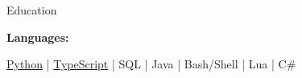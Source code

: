 \documentclass{resume/resume}
\begin{document}
\begin{rSection}{Education}
\begin{adjustwidth}{6em}{0pt}
\end{adjustwidth}

\end{rSection}

%
%   
%
%
%
\vspace{-0.4em}
{\bf Languages:}
\vspace{-1.83em}
\begin{adjustwidth}{6em}{0pt}
    \href{https://github.com/search?q=user\%3ASpelkington+user\%3AUtahTriangle+extension\%3Apy+extension\%3Aipynb&type=Code&ref=advsearch&l=&l=}{Python} | 
    \href{https://github.com/search?p=1&q=user\%3ASpelkington+extension\%3Ats+extension\%3Atsx&type=Code}{TypeScript} | 
    SQL | 
    Java | 
    Bash/Shell | 
    Lua | 
    C\#
\end{adjustwidth}

%
%
%
%
%
%
%
%
%
%
\end{document}
